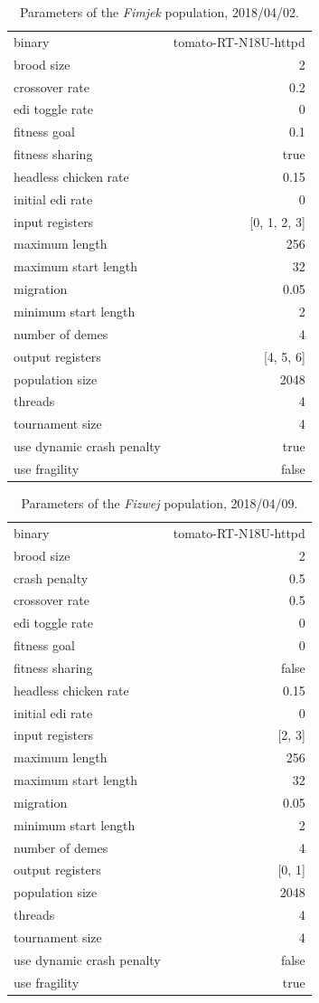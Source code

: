 \documentclass[12pt,glossary]{dalthesis}
\begin{document}
\begin{table}[htbp]
\caption{Parameters of the \emph{Fimjek} population, 2018/04/02.}
\centering
\begin{tabular}{lr}
binary & tomato-RT-N18U-httpd\\
brood size & 2\\
crossover rate & 0.2\\
edi toggle rate & 0\\
fitness goal & 0.1\\
fitness sharing & true\\
headless chicken rate & 0.15\\
initial edi rate & 0\\
input registers & [0, 1, 2, 3]\\
maximum length & 256\\
maximum start length & 32\\
migration & 0.05\\
minimum start length & 2\\
number of demes & 4\\
output registers & [4, 5, 6]\\
population size & 2048\\
threads & 4\\
tournament size & 4\\
use dynamic crash penalty & true\\
use fragility & false\\
\end{tabular}
\end{table}

\begin{table}[htbp]
\caption{Parameters of the \emph{Fizwej} population, 2018/04/09.}
\centering
\begin{tabular}{lr}
binary & tomato-RT-N18U-httpd\\
brood size & 2\\
crash penalty & 0.5\\
crossover rate & 0.5\\
edi toggle rate & 0\\
fitness goal & 0\\
fitness sharing & false\\
headless chicken rate & 0.15\\
initial edi rate & 0\\
input registers & [2, 3]\\
maximum length & 256\\
maximum start length & 32\\
migration & 0.05\\
minimum start length & 2\\
number of demes & 4\\
output registers & [0, 1]\\
population size & 2048\\
threads & 4\\
tournament size & 4\\
use dynamic crash penalty & false\\
use fragility & true\\
\end{tabular}
\end{table}
\end{document}
